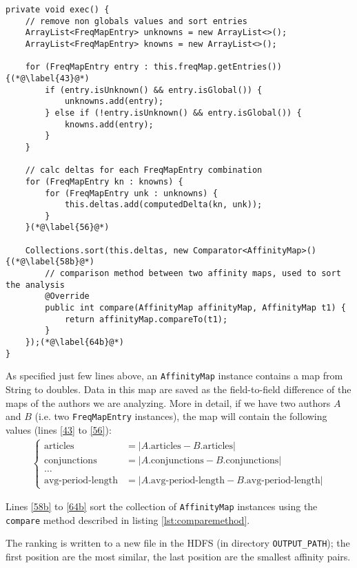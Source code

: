 \documentclass[a4paper,11pt, twoside]{article}
\begin{document}
 	\begin{lstlisting}[firstnumber=38]
private void exec() {
	// remove non globals values and sort entries
	ArrayList<FreqMapEntry> unknowns = new ArrayList<>();
	ArrayList<FreqMapEntry> knowns = new ArrayList<>();
	
	for (FreqMapEntry entry : this.freqMap.getEntries()) {(*@\label{43}@*)
		if (entry.isUnknown() && entry.isGlobal()) {
			unknowns.add(entry);
		} else if (!entry.isUnknown() && entry.isGlobal()) {
			knowns.add(entry);
		}
	}
	
	// calc deltas for each FreqMapEntry combination
	for (FreqMapEntry kn : knowns) {
		for (FreqMapEntry unk : unknowns) {
			this.deltas.add(computedDelta(kn, unk));
		}
	}(*@\label{56}@*)
	
	Collections.sort(this.deltas, new Comparator<AffinityMap>() {(*@\label{58b}@*)
		// comparison method between two affinity maps, used to sort the analysis
		@Override
		public int compare(AffinityMap affinityMap, AffinityMap t1) {
			return affinityMap.compareTo(t1);
		}
	});(*@\label{64b}@*)
}
 	\end{lstlisting}
 	
 	\bigskip
 	\noindent
	As specified just few lines above, an \lstinline|AffinityMap| instance contains a map from String to doubles. Data in this map are saved as the field-to-field difference of the maps of the authors we are analyzing. More in detail, if we have two authors $A$ and $B$ (i.e. two \lstinline|FreqMapEntry| instances), the map will contain the following values (lines \ref{43} to \ref{56}):
	\begin{align*}
		\begin{cases}
			\text{articles} &= |A.\text{articles} - B.\text{articles}| \\
			\text{conjunctions} &= |A. \text{conjunctions}- B.\text{conjunctions}| \\
			\dots& \\
			\text{avg-period-length}&= |A.\text{avg-period-length} - B.\text{avg-period-length}|
		\end{cases}
	\end{align*}
	
	Lines \ref{58b} to \ref{64b} sort the collection of \lstinline|AffinityMap| instances using the \lstinline|compare| method described in listing \ref{lst:comparemethod}.
	
	The ranking is written to a new file in the HDFS (in directory \lstinline|OUTPUT_PATH|); the first position are the most similar, the last position are the smallest affinity pairs.
	
\end{document}
